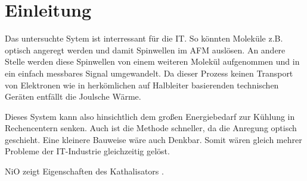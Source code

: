\chapter{Einleitung}
    Das untersuchte Sytem ist interressant für die IT.
    So könnten Moleküle z.B. optisch angeregt werden und damit Spinwellen im AFM auslösen. 
    An andere Stelle werden diese Spinwellen von einem weiteren Molekül aufgenommen und in ein einfach messbares Signal umgewandelt.
    Da dieser Prozess keinen Transport von Elektronen wie in herkömlichen auf Halbleiter basierenden technischen Geräten entfällt die Joulsche Wärme.

    Dieses System kann also hinsichtlich dem großen Energiebedarf zur Kühlung in Rechencentern senken.
    Auch ist die Methode schneller, da die Anregung optisch geschieht.
    Eine kleinere Bauweise wäre auch Denkbar. 
    Somit wären gleich mehrer Probleme der IT-Industrie gleichzeitig gelöst.

    NiO zeigt Eigenschaften des Kathalisators \cite{kunz_chemisorption_1985}.